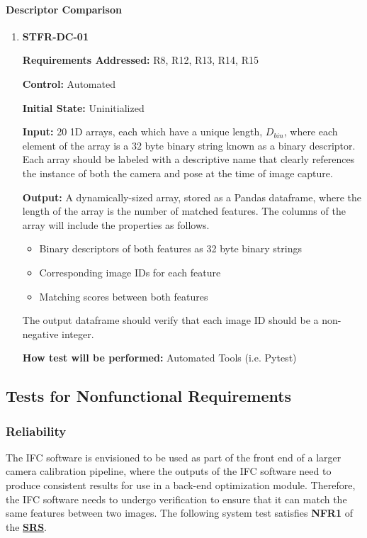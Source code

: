 \documentclass[12pt, titlepage]{article}
\begin{document}
\paragraph{Descriptor Comparison}
\begin{enumerate}
\item \hypertarget{STFR-DC-01}{\textbf{STFR-DC-01}\\}
\textbf{Requirements Addressed:} R8, R12, R13, R14, R15

\textbf{Control:} Automated		

\textbf{Initial State:} Uninitialized

\textbf{Input:} 20 1D arrays, each which have a unique length, $D_{bin}$, where each element of the 
array is a 32 byte binary string known as a binary descriptor. Each array should be labeled with a 
descriptive name that clearly references the instance of both the camera and pose at the time of image 
capture.

\textbf{Output:} A dynamically-sized array, stored as a Pandas dataframe, where the length of the array is the 
number of matched features. The columns of the array will include the properties as follows.
\begin{itemize}
\item Binary descriptors of both features as 32 byte binary strings
\item Corresponding image IDs for each feature
\item Matching scores between both features
\end{itemize}

The output dataframe should verify that each image ID should be a non-negative integer.

\textbf{How test will be performed:} Automated Tools (i.e. Pytest)
\end{enumerate}

\subsection{Tests for Nonfunctional Requirements}\label{NFR_Tests}
\subsubsection{Reliability}
The IFC software is envisioned to be used as part of the front end of a larger camera calibration pipeline, 
where the outputs of the IFC software need to produce consistent results for use in a back-end optimization 
module. Therefore, the IFC software needs to undergo verification to ensure that it can match the same 
features between two images. The following system test satisfies \textbf{NFR1} of the 
\textbf{\href{https://github.com/KiranSingh15/CAS-741-Image-Correspondences/blob/main/docs/SRS/SRS.pdf}
{SRS}}.
\end{document}
